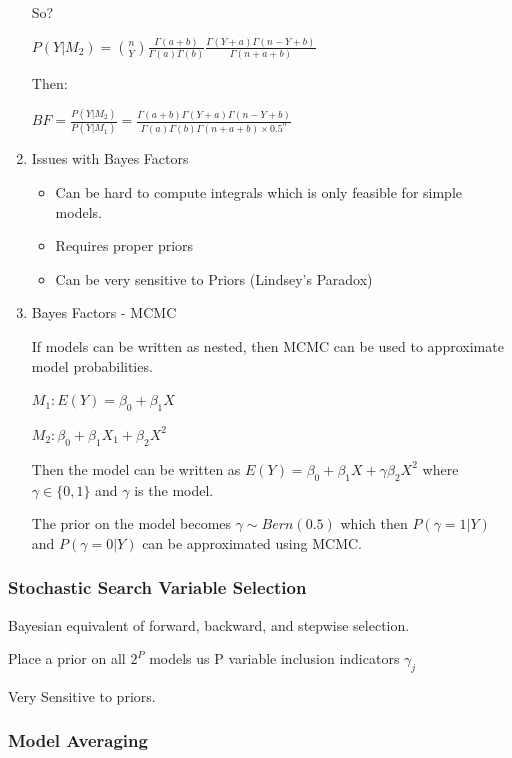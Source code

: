 \documentclass[11pt]{article}
\begin{document}
\begin{enumerate}
So?

\(P(Y | M_2) = {n \choose Y} \frac{\Gamma(a + b)}{\Gamma (a) \Gamma (b)} \frac{\Gamma (Y + a) \Gamma(n - Y + b)}{\Gamma (n + a + b)}\)

Then:

\(BF = \frac{P(Y | M_2)}{P (Y | M_1)} = \frac{\Gamma (a + b) \Gamma(Y + a) \Gamma
(n - Y + b)}{\Gamma(a) \Gamma (b) \Gamma(n + a + b) \times 0.5^n}\)


\item Issues with Bayes Factors
\label{sec:orgebbe2e7}

\begin{itemize}
\item Can be hard to compute integrals which is only feasible for simple models.
\item Requires proper priors
\item Can be very sensitive to Priors (Lindsey's Paradox)
\end{itemize}

\item Bayes Factors - MCMC
\label{sec:orgbabeca3}

If models can be written as nested, then MCMC can be used to approximate model
probabilities.

\(M_1 : E(Y) = \beta_0 + \beta_1 X\)

\(M_2 : \beta_0 + \beta_1 X_1 + \beta_2 X^2\)

Then the model can be written as \(E(Y) = \beta_0 + \beta_1 X + \gamma \beta_2
X^2\) where \(\gamma \in \{ 0, 1\}\) and \(\gamma\) is the model.

The prior on the model becomes \(\gamma \sim Bern(0.5)\) which then \(P(\gamma =
1 | Y)\) and \(P(\gamma = 0 | Y)\) can be approximated using MCMC.
\end{enumerate}

\subsubsection{Stochastic Search Variable Selection}
\label{sec:orgb005bbe}

Bayesian equivalent of forward, backward, and stepwise selection.

Place a prior on all \(2^P\) models us P variable inclusion indicators \(\gamma_j\)

Very Sensitive to priors.

\subsubsection{Model Averaging}
\label{sec:org8daee72}
\end{document}
